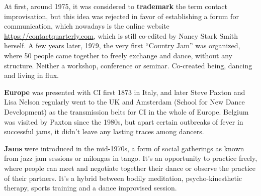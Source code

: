 At first, around 1975, it was considered to \textbf{trademark} the term contact improvisation, but this idea was rejected in favor of establishing a forum for communication, which nowadays is the online website \url{https://contactquarterly.com}, which is still co-edited by Nancy Stark Smith herself.
A few years later, 1979, the very first ``Country Jam'' was organized, where 50 people came together to freely exchange and dance, without any structure.
Neither a workshop, conference or seminar.
Co-created being, dancing and living in flux.

\textbf{Europe} was presented with CI first 1873 in Italy, and later Steve Paxton and Lisa Nelson regularly went to the UK and Amsterdam (School for New Dance Development) as the transmission belts for CI in the whole of Europe.
Belgium was visited by Paxton since the 1980s, but apart certain outbreaks of fever in successful jams, it didn't leave any lasting traces among dancers.

\textbf{Jams} were introduced in the mid-1970s, a form of social gatherings as known from jazz jam sessions or milongas in tango.
It's an opportunity to practice freely, where people can meet and negotiate together their dance or observe the practice of their partners.
It's a hybrid between bodily meditation, psycho-kinesthetic therapy, sports training and a dance improvised session.